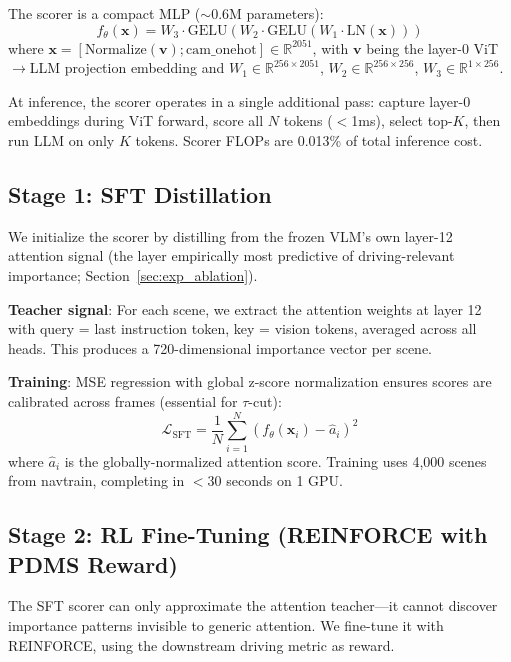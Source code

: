 \documentclass[letterpaper]{article} %
\begin{document}
The scorer is a compact MLP (${\sim}0.6$M parameters):
\begin{equation}
f_\theta(\mathbf{x}) = W_3 \cdot \text{GELU}(W_2 \cdot \text{GELU}(W_1 \cdot \text{LN}(\mathbf{x})))
\end{equation}
where $\mathbf{x} = [\text{Normalize}(\mathbf{v}); \text{cam\_onehot}] \in \mathbb{R}^{2051}$, with $\mathbf{v}$ being the layer-0 ViT$\to$LLM projection embedding and $W_1 \in \mathbb{R}^{256 \times 2051}$, $W_2 \in \mathbb{R}^{256 \times 256}$, $W_3 \in \mathbb{R}^{1 \times 256}$.

At inference, the scorer operates in a single additional pass: capture layer-0 embeddings during ViT forward, score all $N$ tokens ($<$1ms), select top-$K$, then run LLM on only $K$ tokens.
Scorer FLOPs are 0.013\% of total inference cost.

\subsection{Stage 1: SFT Distillation}
\label{sec:sft}

We initialize the scorer by distilling from the frozen VLM's own layer-12 attention signal (the layer empirically most predictive of driving-relevant importance; Section~\ref{sec:exp_ablation}).

\textbf{Teacher signal}: For each scene, we extract the attention weights at layer 12 with query = last instruction token, key = vision tokens, averaged across all heads.
This produces a 720-dimensional importance vector per scene.

\textbf{Training}: MSE regression with global z-score normalization ensures scores are calibrated across frames (essential for $\tau$-cut):
\begin{equation}
\mathcal{L}_\text{SFT} = \frac{1}{N} \sum_{i=1}^{N} \left( f_\theta(\mathbf{x}_i) - \hat{a}_i \right)^2
\end{equation}
where $\hat{a}_i$ is the globally-normalized attention score.
Training uses 4,000 scenes from navtrain, completing in $<$30 seconds on 1 GPU.

\subsection{Stage 2: RL Fine-Tuning (REINFORCE with PDMS Reward)}
\label{sec:rl}

The SFT scorer can only approximate the attention teacher---it cannot discover importance patterns invisible to generic attention.
We fine-tune it with REINFORCE, using the downstream driving metric as reward.
\end{document}

